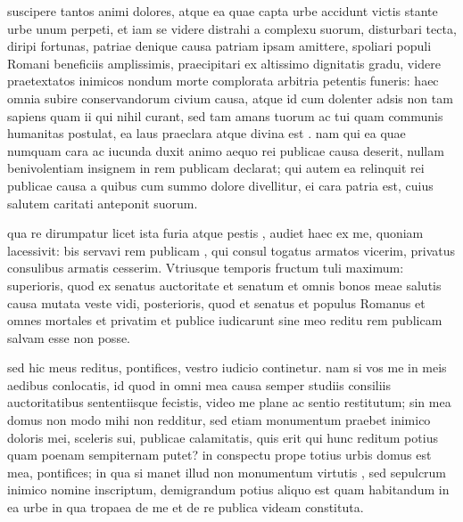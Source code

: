  suscipere tantos animi dolores, atque ea quae capta urbe accidunt victis stante urbe unum perpeti, et iam se videre distrahi a complexu suorum, disturbari tecta, diripi fortunas, patriae denique causa patriam ipsam amittere, spoliari populi Romani beneficiis amplissimis, praecipitari ex altissimo dignitatis gradu, videre praetextatos inimicos nondum morte complorata arbitria petentis funeris: haec omnia subire conservandorum civium causa, atque id cum dolenter adsis non tam sapiens quam ii qui nihil curant, sed tam amans tuorum ac tui quam communis humanitas postulat, ea laus praeclara atque divina est . nam qui ea quae numquam cara ac iucunda duxit animo aequo rei publicae causa deserit, nullam benivolentiam insignem in rem publicam declarat; qui autem ea relinquit rei publicae causa a quibus cum summo dolore divellitur, ei cara patria est, cuius salutem caritati anteponit suorum.

 qua re dirumpatur licet ista furia atque pestis , audiet haec ex me, quoniam lacessivit: bis servavi rem publicam , qui consul togatus armatos vicerim, privatus consulibus armatis cesserim. Vtriusque temporis fructum tuli maximum: superioris, quod ex senatus auctoritate et senatum et omnis bonos meae salutis causa mutata veste vidi, posterioris, quod et senatus et populus Romanus et omnes mortales et privatim et publice iudicarunt sine meo reditu rem publicam salvam esse non posse.

 sed hic meus reditus, pontifices, vestro iudicio continetur. nam si vos me in meis aedibus conlocatis, id quod in omni mea causa semper studiis consiliis auctoritatibus sententiisque fecistis, video me plane ac sentio restitutum; sin mea domus non modo mihi non redditur, sed etiam monumentum praebet inimico doloris mei, sceleris sui, publicae calamitatis, quis erit qui hunc reditum potius quam poenam sempiternam putet? in conspectu prope totius urbis domus est mea, pontifices; in qua si manet illud non monumentum virtutis , sed sepulcrum inimico nomine inscriptum, demigrandum potius aliquo est quam habitandum in ea urbe in qua tropaea de me et de re publica videam constituta.

